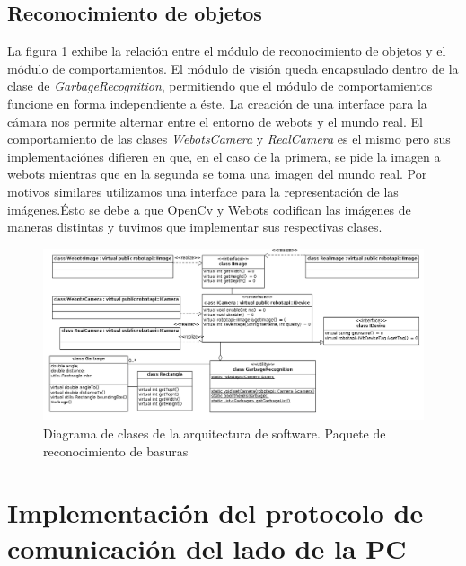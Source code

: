 \subsection{Reconocimiento de objetos}
La figura \ref{fig:soft_arq_reconmodule} exhibe la relaci\'on entre el m\'odulo de reconocimiento de 
objetos y el m\'odulo de comportamientos. El m\'odulo de visi\'on queda encapsulado dentro
de la clase de \textit{GarbageRecognition}, permitiendo que el m\'odulo de comportamientos funcione en
forma independiente a \'este. La creaci\'on de una interface para la c\'amara nos permite alternar
entre el entorno de webots y el mundo real. El comportamiento de las clases \textit{WebotsCamera} y 
\textit{RealCamera} es el mismo pero sus implementaci\'ones difieren en que, en el caso de la primera, se pide
la imagen a webots mientras
que en la segunda se toma una imagen del mundo real. Por motivos similares utilizamos una interface para 
la representaci\'on de las im\'agenes.\'Esto se debe a que OpenCv y Webots codifican las im\'agenes de
maneras distintas y tuvimos que implementar sus respectivas clases. 
\begin{landscape}
\begin{figure}[h]
	\centering
	\includegraphics[scale=0.5]{comportamientos/figures/api3.png}
	\caption[Arquitectura de software: m\'odulo de reconocimiento]{Diagrama de clases de
	la arquitectura de software. Paquete de reconocimiento de basuras}
	\label{fig:soft_arq_reconmodule}
\end{figure}
\end{landscape}

\section[Implementaci\'on del protocolo en PC]{Implementaci\'on del protocolo de comunicaci\'on del lado de la PC}
